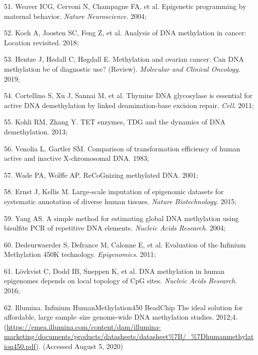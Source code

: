 \documentclass[11pt,oneside]{bristolthesis}
\newenvironment{cslreferences}%
  {}%
  {\par}
\begin{document}
\begin{cslreferences}
\leavevmode\hypertarget{ref-Weaver2004}{}%
51. Weaver ICG, Cervoni N, Champagne FA, et al. Epigenetic programming by maternal behavior. \emph{Nature Neuroscience}. 2004;

\leavevmode\hypertarget{ref-Koch2018}{}%
52. Koch A, Joosten SC, Feng Z, et al. Analysis of DNA methylation in cancer: Location revisited. 2018;

\leavevmode\hypertarget{ref-Hentze2019}{}%
53. Hentze J, Hødall C, Høgdall E. Methylation and ovarian cancer: Can DNA methylation be of diagnostic use? (Review). \emph{Molecular and Clinical Oncology}. 2019;

\leavevmode\hypertarget{ref-Cortellino2011}{}%
54. Cortellino S, Xu J, Sannai M, et al. Thymine DNA glycosylase is essential for active DNA demethylation by linked deamination-base excision repair. \emph{Cell}. 2011;

\leavevmode\hypertarget{ref-Kohli2013}{}%
55. Kohli RM, Zhang Y. TET enzymes, TDG and the dynamics of DNA demethylation. 2013;

\leavevmode\hypertarget{ref-Venolia1983}{}%
56. Venolia L, Gartler SM. Comparison of transformation efficiency of human active and inactive X-chromosomal DNA. 1983;

\leavevmode\hypertarget{ref-Wade2001}{}%
57. Wade PA, Wolffe AP. ReCoGnizing methylated DNA. 2001;

\leavevmode\hypertarget{ref-Ernst2015}{}%
58. Ernst J, Kellis M. Large-scale imputation of epigenomic datasets for systematic annotation of diverse human tissues. \emph{Nature Biotechnology}. 2015;

\leavevmode\hypertarget{ref-Yang2004}{}%
59. Yang AS. A simple method for estimating global DNA methylation using bisulfite PCR of repetitive DNA elements. \emph{Nucleic Acids Research}. 2004;

\leavevmode\hypertarget{ref-Dedeurwaerder2011}{}%
60. Dedeurwaerder S, Defrance M, Calonne E, et al. Evaluation of the Infinium Methylation 450K technology. \emph{Epigenomics}. 2011;

\leavevmode\hypertarget{ref-Lovkvist2016}{}%
61. Lövkvist C, Dodd IB, Sneppen K, et al. DNA methylation in human epigenomes depends on local topology of CpG sites. \emph{Nucleic Acids Research}. 2016;

\leavevmode\hypertarget{ref-Illumina2012}{}%
62. Illumina. Infinium HumanMethylation450 BeadChip The ideal solution for affordable, large sample--size genome-wide DNA methylation studies. 2012;4. (\url{https://emea.illumina.com/content/dam/illumina-marketing/documents/products/datasheets/datasheet\%7B/_\%7Dhumanmethylation450.pdf}). (Accessed August 5, 2020)


\end{cslreferences}
\end{document}

